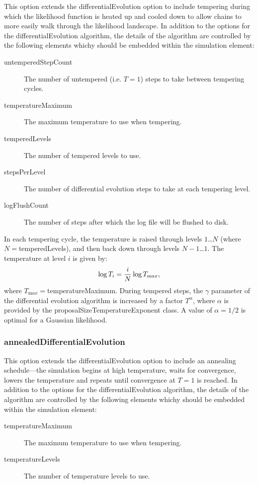 This option extends the {\normalfont \ttfamily differentialEvolution} option to include tempering during which the likelihood function is heated up and cooled down to allow chains to more easily walk through the likelihood landscape. In addition to the options for the {\normalfont \ttfamily differentialEvolution} algorithm, the details of the algorithm are controlled by the following elements whichy should be embedded within the {\normalfont \ttfamily simulation} element:
\begin{description}
\item[{\normalfont \ttfamily untemperedStepCount}] The number of untempered (i.e. $T=1$) steps to take between tempering cycles.
\item[{\normalfont \ttfamily temperatureMaximum}] The maximum temperature to use when tempering.
\item[{\normalfont \ttfamily temperedLevels}] The number of tempered levels to use.
\item[{\normalfont \ttfamily stepsPerLevel}] The number of differential evolution steps to take at each tempering level.
\item[{\normalfont \ttfamily logFlushCount}] The number of steps after which the log file will be flushed to disk.
\end{description}

In each tempering cycle, the temperature is raised through levels $1$\ldots$N$ (where $N=${\normalfont \ttfamily temperedLevels}), and then back down through levels $N-1$\ldots$1$. The temperature at level $i$ is given by:
\begin{equation}
\log T_i = {i \over N} \log T_{\mathrm max},
\end{equation}
where $T_{\mathrm max}=${\normalfont \ttfamily temperatureMaximum}. During tempered steps, the $\gamma$ parameter of the differential evolution algorithm is increased by a factor $T^\alpha$, where $\alpha$ is provided by the {\normalfont \ttfamily proposalSizeTemperatureExponent} class. A value of $\alpha=1/2$ is optimal for a Gaussian likelihood.

\subsubsection{{\normalfont \ttfamily annealedDifferentialEvolution}}

This option extends the {\normalfont \ttfamily differentialEvolution} option to include an annealing schedule---the simulation begins at high temperature, waits for convergence, lowers the temperature and repeats until convergence at $T=1$ is reached. In addition to the options for the {\normalfont \ttfamily differentialEvolution} algorithm, the details of the algorithm are controlled by the following elements whichy should be embedded within the {\normalfont \ttfamily simulation} element:
\begin{description}
\item[{\normalfont \ttfamily temperatureMaximum}] The maximum temperature to use when tempering.
\item[{\normalfont \ttfamily temperatureLevels}] The number of temperature levels to use.
\end{description}

